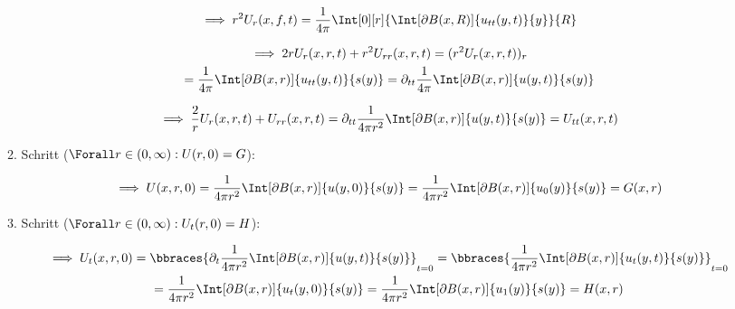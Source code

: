 \begin{solution}
\begin{enumerate}[label = \arabic*.]
\begin{enumerate}[label = 1.\arabic*.]
        \begin{align*}
            \implies
            r^2 U_r(x, f, t)
            =
            \frac{1}{4 \pi}
            \Int[0][r]
            {
                \Int[\partial B(x, R)]{u_{tt}(y, t)}{y}
            }{R}
        \end{align*}

        \begin{multline*}
            \implies
            2 r U_r(x, r, t) + r^2 U_{rr}(x, r, t)
            =
            (r^2 U_r(x, r, t))_r \\
            =
            \frac{1}{4 \pi}
            \Int[\partial B(x, r)]{u_{tt}(y, t)}{s(y)}
            =
            \partial_{tt}
            \frac{1}{4 \pi}
            \Int[\partial B(x, r)]{u(y, t)}{s(y)}
        \end{multline*}

        \begin{align*}
            \implies
            \frac{2}{r}
            U_r(x, r, t) + U_{rr}(x, r, t)
            =
            \partial_{tt}
            \frac{1}{4 \pi r^2}
            \Int[\partial B(x, r)]{u(y, t)}{s(y)}
            =
            U_{tt}(x, r, t)
        \end{align*}

        \item Schritt ($\Forall r \in (0, \infty): U(r, 0) = G$):

        \begin{align*}
            \implies
            U(x, r, 0)
            =
            \frac{1}{4 \pi r^2}
            \Int[\partial B(x, r)]{u(y, 0)}{s(y)}
            =
            \frac{1}{4 \pi r^2}
            \Int[\partial B(x, r)]{u_0(y)}{s(y)}
            =
            G(x, r)
        \end{align*}

        \item Schritt ($\Forall r \in (0, \infty): U_t(r, 0) = H$):

        \begin{multline*}
            \implies
            U_t(x, r, 0)
            =
            \bbraces
            {
                \partial_t
                \frac{1}{4 \pi r^2}
                \Int[\partial B(x, r)]{u(y, t)}{s(y)}
            }_{t = 0}
            =
            \bbraces
            {
                \frac{1}{4 \pi r^2}
                \Int[\partial B(x, r)]{u_t(y, t)}{s(y)}
            }_{t = 0} \\
            =
            \frac{1}{4 \pi r^2}
            \Int[\partial B(x, r)]{u_t(y, 0)}{s(y)}
            =
            \frac{1}{4 \pi r^2}
            \Int[\partial B(x, r)]{u_1(y)}{s(y)}
            =
            H(x, r)
        \end{multline*}


\end{enumerate}
\end{enumerate}
\end{solution}
